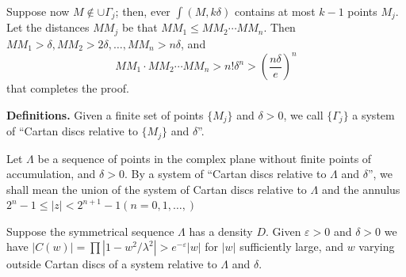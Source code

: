 Suppose now $M \notin \cup \Gamma_j$; then, ever $\int (M, k \delta)$
contains at most $k-1$ points $M_j$. Let the distances $MM_j$ be that
$MM_1 \le MM_2 \cdots MM_n$. Then $MM_1 > \delta, MM_2 > 2 \delta
,\ldots, MM_n > n \delta$, and 
$$
MM_1 \cdot MM_2 \cdots MM_n > n! \delta^n > \left(\frac{n \delta}{e}\right)^n
$$
that completes the proof.

\noindent \textbf{Definitions. }
 Given a finite set of points $\{ M_j\}$ and $ \delta > 0$, we call
 $\{ \Gamma_j\}$ a system of ``Cartan discs relative to $\{ M_j\}$
 and $\delta$''. 

Let $\Lambda$ be a sequence of points in the complex plane without
finite points of accumulation, and $\delta > 0$. By a system of
``Cartan discs relative to $\Lambda$ and $\delta$'', we shall mean the
union of the system of Cartan discs relative to $\Lambda$ and the
annulus $2^n - 1 \le |z| < 2^{n+1} - 1 (n = 0, 1,\ldots,)$ 

\begin{lem}\label{chap14:lem3}
  Suppose the symmetrical sequence $\Lambda$ has a density $D$. Given
  $\varepsilon > 0$ and $\delta > 0$ we have $|C (w)| = \prod | 1-w^2
  / \lambda^2 | > e^{- \varepsilon}|w|$ for $|w|$ sufficiently large,
  and $w$ varying outside Cartan discs of a system relative to
  $\Lambda$ and $\delta$. 
\end{lem}

